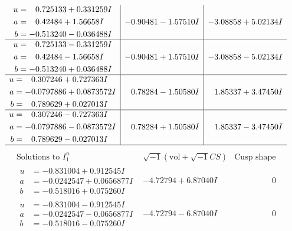 \documentclass[1p]{elsarticle_modified}
\theoremstyle{definition}
\newcommand{\I}{\sqrt{-1}}
\begin{document}
$$\begin{array}{c|c|c}
\begin{aligned}
u &= \phantom{-}0.725133 + 0.331259 I \\
a &= \phantom{-}0.42484 + 1.56658 I \\
b &= -0.513240 - 0.036488 I\end{aligned}
 & -0.90481 - 1.57510 I & -3.08858 + 5.02134 I \\ \hline\begin{aligned}
u &= \phantom{-}0.725133 - 0.331259 I \\
a &= \phantom{-}0.42484 - 1.56658 I \\
b &= -0.513240 + 0.036488 I\end{aligned}
 & -0.90481 + 1.57510 I & -3.08858 - 5.02134 I \\ \hline\begin{aligned}
u &= \phantom{-}0.307246 + 0.727363 I \\
a &= -0.0797886 + 0.0873572 I \\
b &= \phantom{-}0.789629 + 0.027013 I\end{aligned}
 & \phantom{-}0.78284 - 1.50580 I & \phantom{-}1.85337 + 3.47450 I \\ \hline\begin{aligned}
u &= \phantom{-}0.307246 - 0.727363 I \\
a &= -0.0797886 - 0.0873572 I \\
b &= \phantom{-}0.789629 - 0.027013 I\end{aligned}
 & \phantom{-}0.78284 + 1.50580 I & \phantom{-}1.85337 - 3.47450 I\\
 \hline 
 \end{array}$$\newpage$$\begin{array}{c|c|c}  
\text{Solutions to }I^u_{1}& \I (\text{vol} + \sqrt{-1}CS) & \text{Cusp shape}\\
 \hline 
\begin{aligned}
u &= -0.831004 + 0.912545 I \\
a &= -0.0242547 + 0.0656877 I \\
b &= -0.518016 + 0.075260 I\end{aligned}
 & -4.72794 + 6.87040 I & \phantom{-0.000000 } 0 \\ \hline\begin{aligned}
u &= -0.831004 - 0.912545 I \\
a &= -0.0242547 - 0.0656877 I \\
b &= -0.518016 - 0.075260 I\end{aligned}
 & -4.72794 - 6.87040 I & \phantom{-0.000000 } 0 \\ \hline\begin{aligned}

\end{aligned}
\end{array}$$
\end{document}

